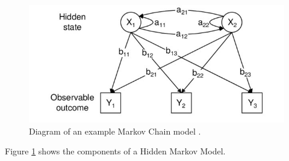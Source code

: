 \documentclass{article}
\begin{document}
\begin{figure}[ht]
    \centering
    \includegraphics[scale=1.5]{Images/HMM-Paper-Diagram.png}
    \caption{Diagram of an example Markov Chain model \cite{choudhury2007state}.}
    \label{fig:Markov}
\end{figure}

Figure \ref{fig:Markov} shows the components of a Hidden Markov Model.






\end{document}
